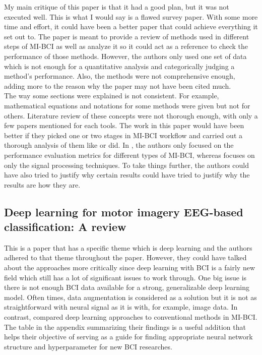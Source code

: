 My main critique of this paper is that it had a good plan, but it was not executed well. This is what I would say is a flawed survey paper. With some more time and effort, it could have been a better paper that could achieve everything it set out to. The paper is meant to provide a review of methods used in different steps of MI-BCI as well as analyze it so it could act as a reference to check the performance of those methods. However, the authors only used one set of data which is not enough for a quantitative analysis and categorically judging a method's performance. Also, the methods were not comprehensive enough, adding more to the reason why the paper may not have been cited much. 
\\The way some sections were explained is not consistent. For example,  mathematical equations and notations for some methods were given but not for others. Literature review of these concepts were not thorough enough, with only a few papers mentioned for each tools.
The work in this paper would have been better if they picked one or two stages in MI-BCI workflow and carried out a thorough analysis of them like \cite{aggarwal_signal_2019} or \cite{thomas_analysis_2013} did. In \cite{thomas_analysis_2013}, the authors only focused on the performance evaluation metrics for different types of MI-BCI, whereas \cite{aggarwal_signal_2019} focuses on only the signal processing techniques. To take things further, the authors could have also tried to justify why certain results could have tried to justify why the results are how they are. \\

\subsection*{Deep learning for motor imagery EEG-based classification: A review}\cite{al-saegh_deep_2021}
This is a paper that has a specific theme which is deep learning and the authors adhered to that theme throughout the paper. However, they could have talked about the approaches more critically since deep learning with BCI is a fairly new field which still has a lot of significant issues to work through. One big issue is there is not enough BCI data available for a strong, generalizable deep learning model. Often times, data augmentation is considered as a solution but it is not as straightforward with neural signal as it is with, for example, image data. 
In contrast, \cite{khademi_review_2023} compared deep learning approaches to conventional methods in MI-BCI. 
\\The table in the appendix summarizing their findings is a useful addition that helps their objective of serving as a guide for finding appropriate neural network structure and hyperparameter for new BCI researches. \\

